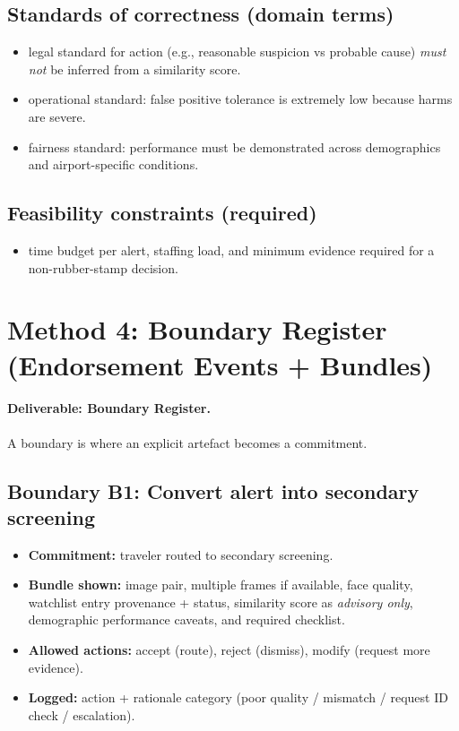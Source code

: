 \subsection*{Standards of correctness (domain terms)}
\begin{itemize}
  \item legal standard for action (e.g., reasonable suspicion vs probable cause) \emph{must not} be inferred from a similarity score.
  \item operational standard: false positive tolerance is extremely low because harms are severe.
  \item fairness standard: performance must be demonstrated across demographics and airport-specific conditions.
\end{itemize}

\subsection*{Feasibility constraints (required)}
\begin{itemize}
  \item time budget per alert, staffing load, and minimum evidence required for a non-rubber-stamp decision.
\end{itemize}

\section{Method 4: Boundary Register (Endorsement Events + Bundles)}
\label{sec:airport-m4}

\paragraph{Deliverable: Boundary Register.}
A boundary is where an explicit artefact becomes a commitment.

\subsection*{Boundary B1: Convert alert into secondary screening}
\begin{itemize}
  \item \textbf{Commitment:} traveler routed to secondary screening.
  \item \textbf{Bundle shown:} image pair, multiple frames if available, face quality, watchlist entry provenance + status,
        similarity score as \emph{advisory only}, demographic performance caveats, and required checklist.
  \item \textbf{Allowed actions:} accept (route), reject (dismiss), modify (request more evidence).
  \item \textbf{Logged:} action + rationale category (poor quality / mismatch / request ID check / escalation).
\end{itemize}

